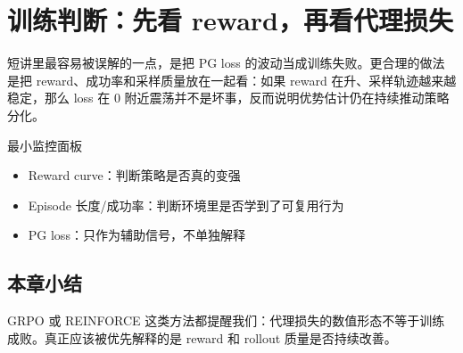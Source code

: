\section{训练判断：先看 reward，再看代理损失}
短讲里最容易被误解的一点，是把 PG loss 的波动当成训练失败。更合理的做法是把 reward、成功率和采样质量放在一起看：如果 reward 在升、采样轨迹越来越稳定，那么 loss 在 0 附近震荡并不是坏事，反而说明优势估计仍在持续推动策略分化。

\begin{knowledgebox}{最小监控面板}
\begin{itemize}
  \item Reward curve：判断策略是否真的变强
  \item Episode 长度/成功率：判断环境里是否学到了可复用行为
  \item PG loss：只作为辅助信号，不单独解释
\end{itemize}
\end{knowledgebox}

\subsection{本章小结}
GRPO 或 REINFORCE 这类方法都提醒我们：代理损失的数值形态不等于训练成败。真正应该被优先解释的是 reward 和 rollout 质量是否持续改善。

\newpage
